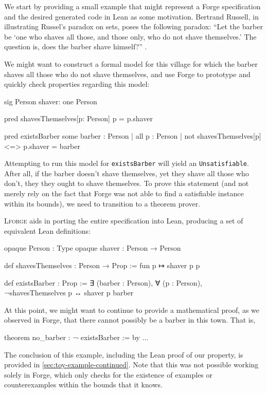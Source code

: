 We start by providing a small example that might represent a Forge specification and the desired generated code in Lean as some motivation. Bertrand Russell, in illustrating Russel's paradox on sets, poses the following paradox: ``Let the barber be `one who shaves all those, and those only, who do not shave themselves.' The question is, does the barber shave himself?'' \cite[101]{russell2009philosophy}. 

We might want to construct a formal model for this village for which the barber shaves all those who do not shave themselves, and use Forge to prototype and quickly check properties regarding this model: 

\begin{forge*}
sig Person {
  shaver: one Person
}

pred shavesThemselves[p: Person] {
  p = p.shaver
}

pred existsBarber {
  some barber : Person | all p : Person | {
    not shavesThemselves[p] <=> p.shaver = barber
  }
}
\end{forge*}

Attempting to run this model for \texttt{existsBarber} will yield an \texttt{Unsatisfiable}. After all, if the barber doesn't shave themselves, yet they shave all those who don't, they they ought to shave themselves. To prove this statement (and not merely rely on the fact that Forge was not able to find a satisfiable instance within its bounds), we need to transition to a theorem prover. 

\textsc{Lforge} aids in porting the entire specification into Lean, producing a set of equivalent Lean definitions: 

\begin{lean*}
opaque Person : Type
opaque shaver : Person → Person

def shavesThemselves : Person → Prop :=
  fun p ↦ shaver p p

def existsBarber : Prop :=
  ∃ (barber : Person), ∀ (p : Person), ¬shavesThemselves p ↔ shaver p barber
\end{lean*}
At this point, we might want to continue to provide a mathematical proof, as we observed in Forge, that there cannot possibly be a barber in this town. That is, 

\begin{lean*}
theorem no_barber : ¬ existsBarber := by ...
\end{lean*}
The conclusion of this example, including the Lean proof of our property, is provided in \cref{sec:toy-example-continued}. Note that this was not possible working solely in Forge, which only checks for the existence of examples or counterexamples within the bounds that it knows. 

